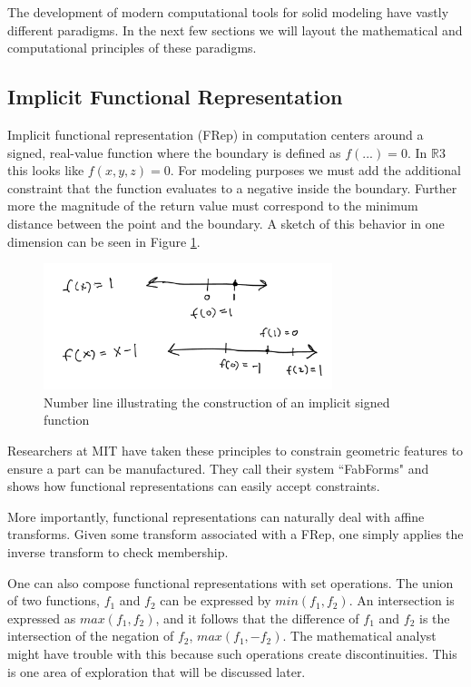 \documentclass[a4paper]{article}
\begin{document}
The development of modern
computational tools for solid modeling have vastly different paradigms. In
the next few sections we will layout the mathematical and computational
principles of these paradigms.

\subsection{Implicit Functional Representation}

Implicit functional representation (FRep) in computation centers around a signed, real-value
function where the boundary is defined as $f(...) = 0$.
In $\mathbb{R}3$ this looks like $f(x,y,z) = 0$. For modeling purposes we must add the
additional constraint that the function evaluates to a negative inside the
boundary. Further more the magnitude of the return value must correspond to
the minimum distance between the point and the boundary.\cite{Olah_2011}
A sketch of this behavior in one dimension
can be seen in Figure \ref{fig:implicit-sketch}.

\begin{figure}[h!]
  \centering
    \includegraphics[width=0.75\textwidth]{img/implicit_sketch.png}
  \caption{Number line illustrating the construction of an implicit signed function}
  \label{fig:implicit-sketch}
\end{figure}

Researchers at MIT have taken these principles to constrain
geometric features to ensure a part can be manufactured.\cite{Shugrina_Shamir_Matusik_2015}
They call their system ``FabForms" and shows how functional representations
can easily accept constraints.

More importantly, functional representations can naturally deal with affine
transforms. \cite{Henderson_2002} Given some transform associated with a
FRep, one simply applies the inverse transform to check membership.

One can also compose functional representations with set operations. The union
of two functions, $f_1$ and $f_2$ can be expressed by $min(f_1,f_2)$. An
intersection is expressed as $max(f_1,f_2)$, and it follows that the difference
of $f_1$ and $f_2$ is the intersection of the negation of $f_2$, $max(f_1,-f_2)$.
The mathematical analyst might have trouble with this because such operations
create discontinuities. This is one area of exploration that will be discussed
later.
\end{document}
